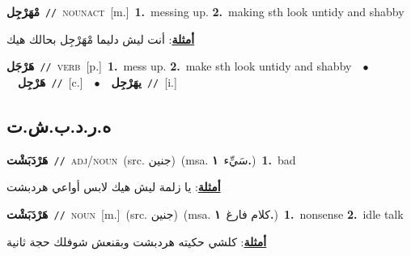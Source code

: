 \documentclass[10pt,a4paper,twoside]{article} %
\begin{document}
\begin{multicols}{2}
{\setlength\topsep{0pt}\textbf{\foreignlanguage{arabic}{مْهَرْجِل}}\ {\color{gray}\texttt{//}\color{black}}\ \textsc{noun\textunderscore act}\ [m.]\ \textbf{1.}~messing up.  \textbf{2.}~making sth look untidy and shabby\  \begin{flushright}\color{gray}\foreignlanguage{arabic}{\textbf{\underline{\foreignlanguage{arabic}{أمثلة}}}: أنت ليش دليما مْهَرْجِل بحالك هيك}\end{flushright}\color{black}} \vspace{2mm}

{\setlength\topsep{0pt}\textbf{\foreignlanguage{arabic}{هَرْجَل}}\ {\color{gray}\texttt{//}\color{black}}\ \textsc{verb}\ [p.]\ \textbf{1.}~mess up.  \textbf{2.}~make sth look untidy and shabby\ \ $\bullet$\ \ \setlength\topsep{0pt}\textbf{\foreignlanguage{arabic}{هَرْجِل}}\ {\color{gray}\texttt{//}\color{black}}\ [c.]\ \ $\bullet$\ \ \setlength\topsep{0pt}\textbf{\foreignlanguage{arabic}{يهَرْجِل}}\ {\color{gray}\texttt{//}\color{black}}\ [i.]\ } \vspace{2mm}

\vspace{-3mm}
\subsection*{\color{blue}\foreignlanguage{arabic}{ه.ر.د.ب.ش.ت}\color{blue}{ (ntws)}} 

{\setlength\topsep{0pt}\textbf{\foreignlanguage{arabic}{هَرْدَبَشْت}}\ {\color{gray}\texttt{//}\color{black}}\ \textsc{adj/noun}\ (src. \color{gray}\foreignlanguage{arabic}{جنين}\color{black})\ \color{gray}(msa. \foreignlanguage{arabic}{سَيِّء}~\foreignlanguage{arabic}{\textbf{١.}})\color{black}\ \textbf{1.}~bad\  \begin{flushright}\color{gray}\foreignlanguage{arabic}{\textbf{\underline{\foreignlanguage{arabic}{أمثلة}}}: يا زلمة ليش هيك لابس أواعي هردبشت}\end{flushright}\color{black}} \vspace{2mm}

{\setlength\topsep{0pt}\textbf{\foreignlanguage{arabic}{هَرْدَبَشْت}}\ {\color{gray}\texttt{//}\color{black}}\ \textsc{noun}\ [m.]\ (src. \color{gray}\foreignlanguage{arabic}{جنين}\color{black})\ \color{gray}(msa. \foreignlanguage{arabic}{كلام فارغ}~\foreignlanguage{arabic}{\textbf{١.}})\color{black}\ \textbf{1.}~nonsense  \textbf{2.}~idle talk\  \begin{flushright}\color{gray}\foreignlanguage{arabic}{\textbf{\underline{\foreignlanguage{arabic}{أمثلة}}}: كلشي حكيته هردبشت وبقنعش شوفلك حجة ثانية}\end{flushright}\color{black}} \vspace{2mm}


\end{multicols}
\end{document}
